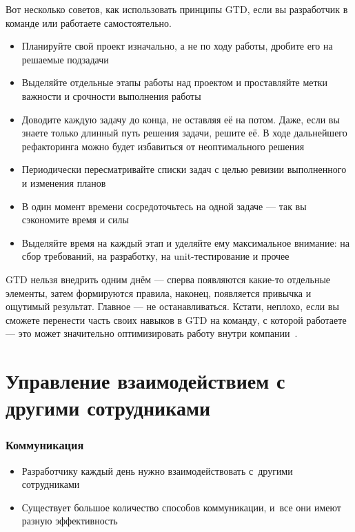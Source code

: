 \documentclass{../industrial-development}
\begin{document}
\lecturenotes

Вот несколько советов, как использовать принципы GTD, если вы разработчик в команде или работаете самостоятельно.

  \begin{itemize}
  \item Планируйте свой проект изначально, а не по ходу работы, дробите его на решаемые подзадачи
  \item Выделяйте отдельные этапы работы над проектом и проставляйте метки важности и срочности выполнения работы
  \item Доводите каждую задачу до конца, не оставляя её на потом. Даже, если вы знаете только длинный путь решения задачи, решите её. В ходе дальнейшего рефакторинга можно будет избавиться от неоптимального решения
  \item Периодически пересматривайте списки задач с целью ревизии выполненного и изменения планов
  \item В один момент времени сосредоточьтесь на одной задаче — так вы сэкономите время и силы
  \item Выделяйте время на каждый этап и уделяйте ему максимальное внимание: на сбор требований, на разработку, на unit-тестирование и прочее
  \end{itemize}

GTD нельзя внедрить одним днём — сперва появляются какие-то отдельные элементы, затем формируются правила, наконец, появляется привычка и ощутимый результат. Главное — не останавливаться. Кстати, неплохо, если вы сможете перенести часть своих навыков в GTD на команду, с которой работаете — это может значительно оптимизировать работу внутри компании~\cite{GTDHabr}.

\section{Управление взаимодействием с другими сотрудниками}

\begin{frame} \frametitle{Коммуникация}
  \begin{itemize}
  \item Разработчику каждый день нужно взаимодействовать с~другими сотрудниками
  \item Существует большое количество способов коммуникации, и~все они имеют разную эффективность
  \end{itemize}
\end{frame}
\end{document}
